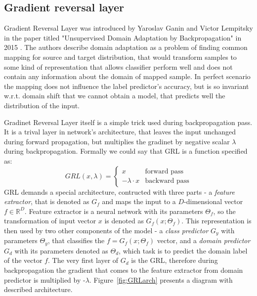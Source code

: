 \documentclass{article}
\begin{document}
\subsection{Gradient reversal layer}
Gradient Reversal Layer was introduced by Yaroslav Ganin and Victor Lempitsky in the paper titled "Unsupervised Domain Adaptation by Backpropagation" in 2015 \cite{pmlr-v37-ganin15}. The authors describe domain adaptation as a problem of finding common mapping for source and target distribution, that would transform samples to some kind of representation that allows classifier perform well and does not contain any information about the domain of mapped sample. In perfect scenario the mapping does not influence the label predictor's accuracy, but is so invariant w.r.t. domain shift that we cannot obtain a model, that predicts well the distribution of the input.
\par
Gradinet Reversal Layer itself is a simple trick used during backpropagation pass. It is a trival layer in network's architecture, that leaves the input unchanged during forward propagation, but multiplies the gradinet by negative scalar $\lambda$ during backpropagation. Formally we could say that GRL is a function specified as:
\begin{equation*}
GRL(x, \lambda) = \begin{cases}
x &\text{forward pass}\\
-\lambda \cdot x &\text{backward pass}
\end{cases}
\end{equation*}
GRL demands a special architecture, contructed with three parts - a \textit{feature extractor}, that is denoted as $G_{f}$ and maps the input to a $D$-dimensional vector $f \in \mathbb{R}^{D}$. Feature extractor is a neural network with its parameters $\Theta_{f}$, so the transformation of input vector $x$ is denoted as $G_{f}(x;\Theta_{f})$. This representation is then used by two other components of the model - a \textit{class predictor} $G_{y}$ with parameters $\Theta_{y}$, that classifies the $f = G_{f}(x;\Theta_{f})$ vector, 
and a \textit{domain predictor} $G_{d}$ with its parameters denoted as $\Theta_{d}$, which task is to predict the domain label of the vector $f$. The very first layer of $G_{d}$ is the GRL, therefore during backpropagation the gradient that comes to the feature extractor from domain predictor is multiplied by -$\lambda$. Figure~\ref{fig:GRLarch} presents a diagram with described architecture.
\par
\end{document}
